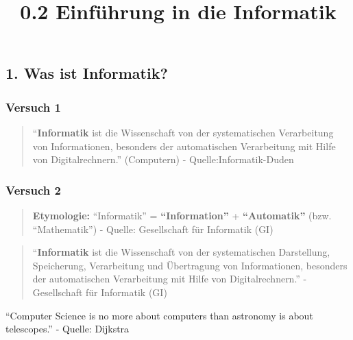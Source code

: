 \documentclass[
  11pt,
  a4paper,
  DIV=11,
  numbers=noendperiod]{scrartcl}
\title{0.2 Einführung in die Informatik}
\author{}
\date{}
\begin{document}
\maketitle


\subsection{1. Was ist Informatik?}\label{was-ist-informatik}

\subsubsection{Versuch 1}\label{versuch-1}

\begin{quote}
``\textbf{Informatik} ist die Wissenschaft von der systematischen
Verarbeitung von Informationen, besonders der automatischen Verarbeitung
mit Hilfe von Digitalrechnern.'' (Computern) - Quelle:Informatik-Duden
\end{quote}

\subsubsection{Versuch 2}\label{versuch-2}

\begin{quote}
\textbf{Etymologie:} ``Informatik'' = \textbf{``Information''} +
\textbf{``Automatik''} (bzw. ``Mathematik'') - Quelle: Gesellschaft für
Informatik (GI)
\end{quote}

\begin{quote}
``\textbf{Informatik} ist die Wissenschaft von der systematischen
Darstellung, Speicherung, Verarbeitung und Übertragung von
Informationen, besonders der automatischen Verarbeitung mit Hilfe von
Digitalrechnern.'' - Gesellschaft für Informatik (GI)
\end{quote}

\begin{tcolorbox}[enhanced jigsaw, left=2mm, bottomtitle=1mm, breakable, toptitle=1mm, colbacktitle=quarto-callout-caution-color!10!white, bottomrule=.15mm, colframe=quarto-callout-caution-color-frame, toprule=.15mm, title=\textcolor{quarto-callout-caution-color}{\faFire}\hspace{0.5em}{ACHTUNG}, colback=white, titlerule=0mm, coltitle=black, opacityback=0, arc=.35mm, rightrule=.15mm, opacitybacktitle=0.6, leftrule=.75mm]

``Computer Science is no more about computers than astronomy is about
telescopes.'' - Quelle: Dijkstra

\end{tcolorbox}
\end{document}
